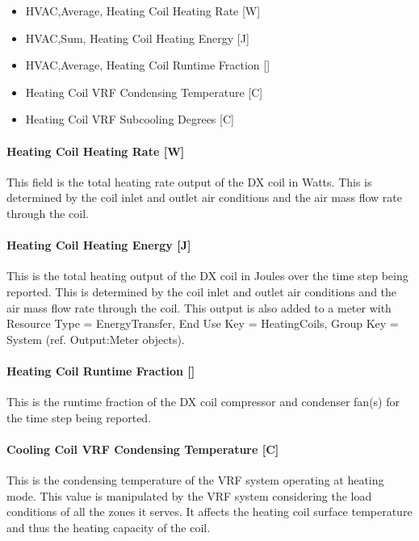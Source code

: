 \begin{itemize}
\item
  HVAC,Average, Heating Coil Heating Rate {[}W{]}
\item
  HVAC,Sum, Heating Coil Heating Energy {[}J{]}
\item
  HVAC,Average, Heating Coil Runtime Fraction {[]}
\item
  Heating Coil VRF Condensing Temperature {[}C{]}
\item
  Heating Coil VRF Subcooling Degrees {[}C{]}
\end{itemize}

\paragraph{Heating Coil Heating Rate {[}W{]}}\label{heating-coil-heating-rate-w-5}

This field is the total heating rate output of the DX coil in Watts. This is determined by the coil inlet and outlet air conditions and the air mass flow rate through the coil.

\paragraph{Heating Coil Heating Energy {[}J{]}}\label{heating-coil-heating-energy-j-5}

This is the total heating output of the DX coil in Joules over the time step being reported. This is determined by the coil inlet and outlet air conditions and the air mass flow rate through the coil. This output is also added to a meter with Resource Type = EnergyTransfer, End Use Key = HeatingCoils, Group Key = System (ref. Output:Meter objects).

\paragraph{Heating Coil Runtime Fraction {[]}}\label{heating-coil-runtime-fraction-2}

This is the runtime fraction of the DX coil compressor and condenser fan(s) for the time step being reported.

\paragraph{Cooling Coil VRF Condensing Temperature {[}C{]}}\label{cooling-coil-vrf-condensing-temperature-c}

This is the condensing temperature of the VRF system operating at heating mode. This value is manipulated by the VRF system considering the load conditions of all the zones it serves. It affects the heating coil surface temperature and thus the heating capacity of the coil.

